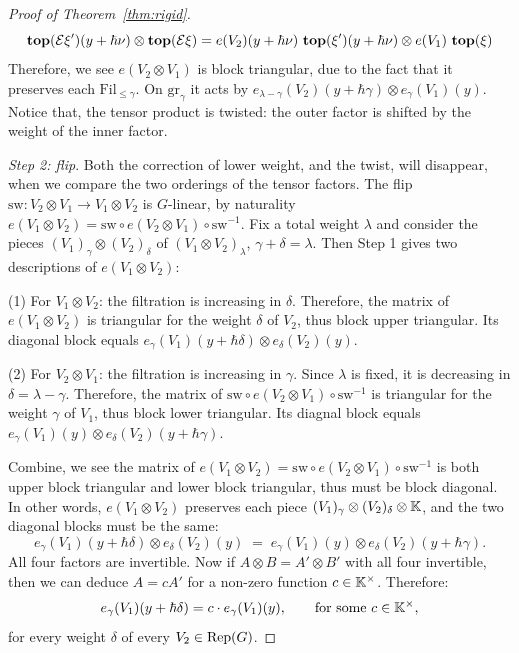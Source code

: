 \documentclass{article}
\theoremstyle{plain}
\theoremstyle{definition}
\theoremstyle{remark}
\numberwithin{equation}{section}
\begin{document}
\begin{proof}[Proof of Theorem~\ref{thm:rigid}]
\[
\operatorname{\mathbf{top}}(\mathcal E\xi')(y+\hbar\nu)\otimes\operatorname{\mathbf{top}}(\mathcal E\xi)=e(V_2)(y+\hbar\nu)\,\operatorname{\mathbf{top}}(\xi')(y+\hbar\nu)\otimes e(V_1)\,\operatorname{\mathbf{top}}(\xi)
\]
Therefore, we see $e(V_2\otimes V_1)$ is block triangular, due to the fact that it preserves each $\mathrm{Fil}_{\le\gamma}$. On $\mathrm{gr}_\gamma$ it acts by $e_{\lambda-\gamma}(V_2)(y+\hbar\gamma)\otimes e_\gamma(V_1)(y)$. Notice that, the tensor product is twisted: the outer factor is shifted by the weight of the inner factor.

\emph{Step 2: flip}. Both the correction of lower weight, and the twist, will disappear, when we compare the two orderings of the tensor factors. The flip $\mathrm{sw}\colon V_2\otimes V_1\to V_1\otimes V_2$ is $G$-linear, by naturality $e(V_1\otimes V_2)=\mathrm{sw}\circ e(V_2\otimes V_1)\circ\mathrm{sw}^{-1}$. Fix a total weight $\lambda$ and consider the pieces $(V_1)_\gamma\otimes(V_2)_\delta$ of $(V_1\otimes V_2)_\lambda$, $\gamma+\delta=\lambda$. Then Step 1 gives two descriptions of $e(V_1\otimes V_2)$:

(1) For $V_1\otimes V_2$: the filtration is increasing in $\delta$. Therefore, the matrix of $e(V_1\otimes V_2)$ is triangular for the weight $\delta$ of $V_2$, thus block upper triangular. Its diagonal block equals $e_\gamma(V_1)(y+\hbar\delta)\otimes e_\delta(V_2)(y)$.

(2) For $V_2\otimes V_1$: the filtration is increasing in $\gamma$. Since $\lambda$ is fixed, it is decreasing in $\delta =\lambda -\gamma$. Therefore, the matrix of $\mathrm{sw}\circ e(V_2\otimes V_1)\circ\mathrm{sw}^{-1}$  is triangular for the  weight $\gamma$ of $V_1$, thus block lower triangular. Its diagnal block equals $e_\gamma(V_1)(y)\otimes e_\delta(V_2)(y+\hbar\gamma)$.

Combine, we see the matrix of $e(V_1 \otimes V_2) = \mathrm{sw} \circ e(V_2 \otimes V_1) \circ \mathrm{sw}^{-1}$ is both upper block triangular and lower block triangular, thus must be block diagonal. In other words, $e(V_1\otimes V_2)$ preserves each piece $(V_1)_\gamma\otimes(V_2)_\delta\otimes\mathbb K$, and the two diagonal blocks must be the same:
\[
e_\gamma(V_1)(y+\hbar\delta)\otimes e_\delta(V_2)(y)\;=\;e_\gamma(V_1)(y)\otimes e_\delta(V_2)(y+\hbar\gamma).
\]
All four factors are invertible. Now if $A\otimes B=A'\otimes B'$ with all four invertible, then we can deduce $A=cA'$ for a non-zero function  $c \in \mathbb K^\times$. Therefore:
\begin{equation}\label{eq:F}
e_\gamma(V_1)(y+\hbar\delta)=c\cdot e_\gamma(V_1)(y),\qquad\text{for some }c\in\mathbb K^\times,
\end{equation}
for every weight $\delta$ of every $V_2\in\operatorname{Rep}(G)$.


\end{proof}
\end{document}
